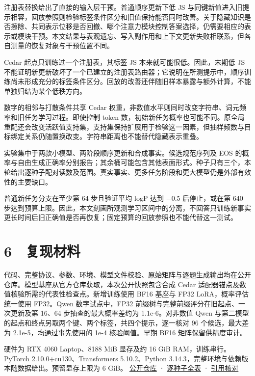 \documentclass[UTF8,fontset=fandol,10pt,a4paper]{ctexart}
\begin{document}
注册表替换给出了直接的输入层干预。普通顺序更新下低 JS 与同键新值进入旧提示相容，回放参照则检验标签条件区分和旧值保持能否同时改善。关于隐藏知识是否擦除、共同表示位移是否回撤、哪个注意力模块控制答案选择，仍需要相应的表示或模块干预。本文结果与表观遗忘、写入副作用和上下文更新失败相联系，但各自测量的恢复对象与干预位置不同。



Cedar 起点只训练过一个注册表，其标签 JS 本来就可能很低。因此，末期低 JS 不能证明新更新破坏了一个已建立的注册表路由器；它说明在所测提示中，顺序训练尚未形成充分的标签条件区分。回放的改善还伴随旧样本暴露与额外计算，不能单独归结为某个低秩方向。



数字的相邻与打散条件共享 Cedar 权重，非数值水平则同时改变字符串、词元频率和旧任务学习过程。即使控制 token 数，初始新任务概率也可能不同。原全局重配还会改变活跃值支持集，支持集保持扩展用于检验这一因素，但抽样频数与目标绑定关系仍随置换改变。字符串距离也不能替代隐藏表示重叠。



实验集中于两款小模型、两阶段顺序更新和合成事实。候选规范序列及 EOS 的概率与自由生成正确率分别报告；其余桶可能包含其他表面形式。种子只有三个，本轮给出逐种子配对读数及范围。真实事实、更多任务阶段和更大模型仍是外部有效性的主要缺口。



普通新任务分支在至少第 64 步且验证平均 logP 达到 −0.5 后停止，或在第 640 步达到预算上限。因此，本文刻画所观测学习区间中的分离，不回答只训练新事实更长时间后旧正确值是否再恢复；固定预算的回放参照也不能代替这一测试。



\section*{6　复现材料}
代码、完整协议、参数、环境、模型文件校验、原始矩阵与逐题生成输出均在公开仓库。模型基座从官方仓库获取，本次公开快照包含合成 Cedar 适配器锚点及数值核验所需的代表性检查点。新增训练使用 BF16 基座与 FP32 LoRA，概率评估统一使用 FP32。Qwen 数字试点中，FP32 前缀树与完整前缀评分在旧起点、一次更新及第 16、64 步抽查的最大概率差约为 1.1e-6。对非数值 Qwen 与第二模型的起点和终点另取两个键、两个标签，共四个提示，逐一核对 96 个候选，最大差为 2.1e-5，均通过事先使用的 1e-4 核验阈值。早期 BF16 矩阵保留供精度审计。



硬件为 RTX 4060 Laptop、8188 MiB 显存及约 16 GiB RAM，训练串行。PyTorch 2.10.0+cu130、Transformers 5.10.2、Python 3.14.3，完整环境与依赖版本随数据给出。预留显存上限为 6 GiB。 \href{https://github.com/soloduist-pixiv/lora-binding-interference}{公开仓库} · \href{https://github.com/soloduist-pixiv/lora-binding-interference/blob/main/paper/review_tables.md}{逐种子全表} · \href{https://github.com/soloduist-pixiv/lora-binding-interference/blob/main/paper/references_audit.md}{引用核对}
\end{document}
